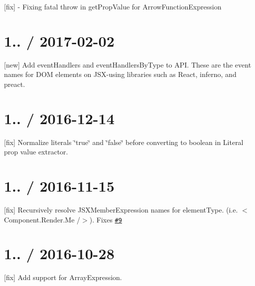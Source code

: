 
\begin{DoxyItemize}
\item \mbox{[}fix\mbox{]} -\/ Fixing fatal throw in {\ttfamily get\+Prop\+Value} for {\ttfamily Arrow\+Function\+Expression}
\end{DoxyItemize}

\section*{1.. / 2017-\/02-\/02 }


\begin{DoxyItemize}
\item \mbox{[}new\mbox{]} Add event\+Handlers and event\+Handlers\+By\+Type to A\+PI. These are the event names for D\+OM elements on J\+S\+X-\/using libraries such as React, inferno, and preact.
\end{DoxyItemize}

\section*{1.. / 2016-\/12-\/14 }


\begin{DoxyItemize}
\item \mbox{[}fix\mbox{]} Normalize literals \char`\"{}true\char`\"{} and \char`\"{}false\char`\"{} before converting to boolean in Literal prop value extractor.
\end{DoxyItemize}

\section*{1.. / 2016-\/11-\/15 }


\begin{DoxyItemize}
\item \mbox{[}fix\mbox{]} Recursively resolve J\+S\+X\+Member\+Expression names for element\+Type. (i.\+e. {\ttfamily $<$Component.\+Render.\+Me /$>$}). Fixes \href{https://github.com/evcohen/jsx-ast-utils/issues/9}{\tt \#9}
\end{DoxyItemize}

\section*{1.. / 2016-\/10-\/28 }


\begin{DoxyItemize}
\item \mbox{[}fix\mbox{]} Add support for {\ttfamily Array\+Expression}.
\end{DoxyItemize}

